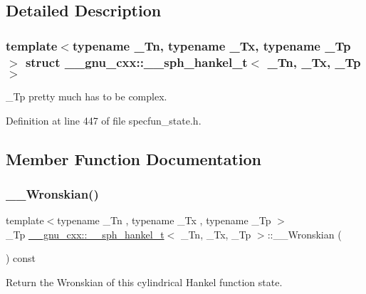 \subsection{Detailed Description}
\subsubsection*{template$<$typename \+\_\+\+Tn, typename \+\_\+\+Tx, typename \+\_\+\+Tp$>$\newline
struct \+\_\+\+\_\+gnu\+\_\+cxx\+::\+\_\+\+\_\+sph\+\_\+hankel\+\_\+t$<$ \+\_\+\+Tn, \+\_\+\+Tx, \+\_\+\+Tp $>$}

\+\_\+\+Tp pretty much has to be complex. 

Definition at line 447 of file specfun\+\_\+state.\+h.



\subsection{Member Function Documentation}
\mbox{\label{struct____gnu__cxx_1_1____sph__hankel__t_a401ba4615906dfc075be66e7048da8c2}} 
\subsubsection{\texorpdfstring{\+\_\+\+\_\+\+Wronskian()}{\_\_Wronskian()}}
{\footnotesize\ttfamily template$<$typename \+\_\+\+Tn , typename \+\_\+\+Tx , typename \+\_\+\+Tp $>$ \\
\+\_\+\+Tp \hyperlink{struct____gnu__cxx_1_1____sph__hankel__t}{\+\_\+\+\_\+gnu\+\_\+cxx\+::\+\_\+\+\_\+sph\+\_\+hankel\+\_\+t}$<$ \+\_\+\+Tn, \+\_\+\+Tx, \+\_\+\+Tp $>$\+::\+\_\+\+\_\+\+Wronskian (\begin{DoxyParamCaption}{ }\end{DoxyParamCaption}) const\hspace{0.3cm}{\ttfamily [inline]}}



Return the Wronskian of this cylindrical Hankel function state. 



